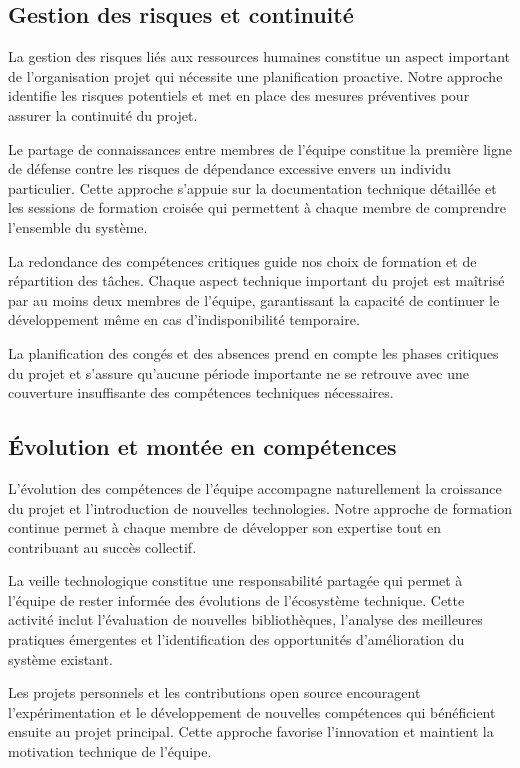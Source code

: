 \subsection{Gestion des risques et continuité}

La gestion des risques liés aux ressources humaines constitue un aspect important de l'organisation projet qui nécessite une planification proactive. Notre approche identifie les risques potentiels et met en place des mesures préventives pour assurer la continuité du projet.

Le partage de connaissances entre membres de l'équipe constitue la première ligne de défense contre les risques de dépendance excessive envers un individu particulier. Cette approche s'appuie sur la documentation technique détaillée et les sessions de formation croisée qui permettent à chaque membre de comprendre l'ensemble du système.

La redondance des compétences critiques guide nos choix de formation et de répartition des tâches. Chaque aspect technique important du projet est maîtrisé par au moins deux membres de l'équipe, garantissant la capacité de continuer le développement même en cas d'indisponibilité temporaire.

La planification des congés et des absences prend en compte les phases critiques du projet et s'assure qu'aucune période importante ne se retrouve avec une couverture insuffisante des compétences techniques nécessaires.

\subsection{Évolution et montée en compétences}

L'évolution des compétences de l'équipe accompagne naturellement la croissance du projet et l'introduction de nouvelles technologies. Notre approche de formation continue permet à chaque membre de développer son expertise tout en contribuant au succès collectif.

La veille technologique constitue une responsabilité partagée qui permet à l'équipe de rester informée des évolutions de l'écosystème technique. Cette activité inclut l'évaluation de nouvelles bibliothèques, l'analyse des meilleures pratiques émergentes et l'identification des opportunités d'amélioration du système existant.

Les projets personnels et les contributions open source encouragent l'expérimentation et le développement de nouvelles compétences qui bénéficient ensuite au projet principal. Cette approche favorise l'innovation et maintient la motivation technique de l'équipe.

